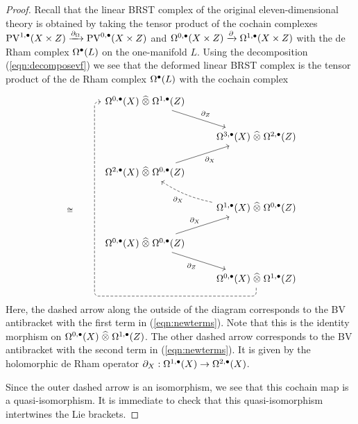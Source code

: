 \documentclass[11pt]{amsart}
\def\PV{{\rm PV}}
\begin{document}
\begin{proof}
Recall that the linear BRST complex of the original eleven-dimensional theory is obtained by taking the tensor product of the cochain complexes $\PV^{1,\bu}(X \times Z) \xto{\partial_\Omega} \PV^{0,\bu}(X \times Z)$ and $\Omega^{0,\bullet}(X \times Z) \xrightarrow{\partial} \Omega^{1,\bullet}(X \times Z)$ with the de Rham complex $\Omega^\bullet(L)$ on the one-manifold $L$.
Using the decomposition (\ref{eqn:decomposevf}) we see that the deformed linear BRST complex is the tensor product of the de Rham complex $\Omega^{\bullet}(L)$ with the cochain complex
\[
  \begin{tikzcd}
  & \Omega^{0,\bu}(X) \; \Hat{\otimes} \; \Omega^{1,\bu}(Z) \ar[dr, "\partial_Z"] \\
  & & \Omega^{3,\bu}(X) \; \Hat{\otimes} \; \Omega^{2,\bu}(Z) \\
 & \Omega^{2,\bu}(X) \; \Hat{\otimes} \; \Omega^{0,\bu}(Z) \ar[ur, "\partial_X"'] & \\
\;_{\cong}  & & \Omega^{1,\bu}(X) \; \Hat{\otimes} \; \Omega^{0,\bu}(Z) \ar[ul, dashed, bend left = 10, "\partial_X"]\\
 & \Omega^{0,\bu}(X) \; \Hat{\otimes} \; \Omega^{0,\bu}(Z) \ar[ur, "\partial_X"] \ar[dr,"\partial_Z"'] \\
  & & \Omega^{0,\bu}(X) \; \Hat{\otimes} \; \Omega^{1,\bu}(Z)
\ar[dashed, rounded corners, to path={ -- ([yshift=-2ex]\tikztostart.south) -| ([xshift=-1.5ex]\tikztotarget.west) -- (\tikztotarget)}, uuuuul]
  \end{tikzcd}
\]
Here, the dashed arrow along the outside of the diagram corresponds to the BV antibracket with the first term in (\ref{eqn:newterms}).
Note that this is the identity morphism on $\Omega^{0,\bullet}(X) \; \widehat{\otimes} \; \Omega^{1,\bullet}(Z)$.
The other dashed arrow corresponds to the BV antibracket with the second term in (\ref{eqn:newterms}).
It is given by the holomorphic de Rham operator $\partial_X : \Omega^{1,\bullet}(X) \to \Omega^{2,\bullet}(X)$.

Since the outer dashed arrow is an isomorphism, we see that this cochain map is a quasi-isomorphism.
It is immediate to check that this quasi-isomorphism intertwines the Lie brackets.


\end{proof}
\end{document}
